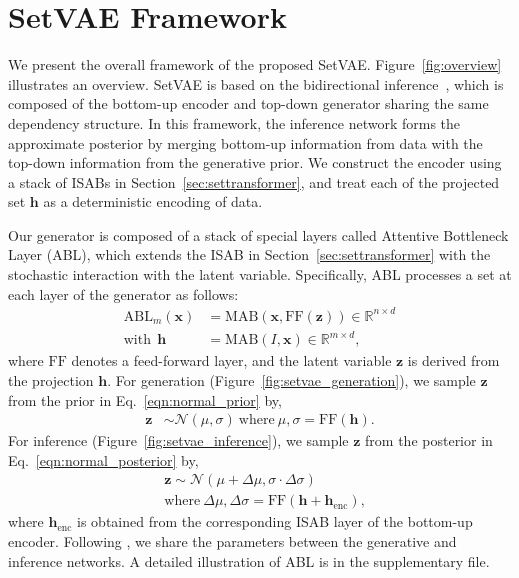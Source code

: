 \documentclass[final]{arxiv/cvpr}
\begin{document}
\section{SetVAE Framework}
\label{sec:architecture}
We present the overall framework of the proposed SetVAE. 
Figure~\ref{fig:overview} illustrates an overview.
SetVAE is based on the bidirectional inference~\cite{sonderby2016ladder}, which is composed of the bottom-up encoder and top-down generator sharing the same dependency structure.
In this framework, the inference network forms the approximate posterior by merging bottom-up information from data with the top-down information from the generative prior.
We construct the encoder using a stack of ISABs in Section~\ref{sec:settransformer}, and treat each of the projected set $\mathbf{h}$ as a deterministic encoding of data.

Our generator is composed of a stack of special layers called Attentive Bottleneck Layer (ABL), which extends the ISAB in Section~\ref{sec:settransformer} with the stochastic interaction with the latent variable.
Specifically, ABL processes a set at each layer of the generator as follows:
\begin{align}
    \text{ABL}_m(\mathbf{x}) &= \text{MAB}(\mathbf{x}, \text{FF}(\mathbf{z}))\in \mathbb{R}^{n\times d}\label{eqn:abp}\\
    \text{with}~~\mathbf{h} &= \text{MAB}(I, \mathbf{x})\in \mathbb{R}^{m\times d}\label{eqn:abl_bottleneck},
\end{align}
where $\text{FF}$ denotes a feed-forward layer, and the latent variable $\mathbf{z}$ is derived from the projection $\mathbf{h}$.
For generation (Figure~\ref{fig:setvae_generation}), we sample $\mathbf{z}$ from the prior in Eq.~\eqref{eqn:normal_prior} by,
\begin{align}
    \mathbf{z} &\sim \mathcal{N}(\mu, \sigma)~\text{where}~\mu, \sigma = \text{FF}(\mathbf{h}).
    \label{eqn:abp_z_prior}
\end{align}
For inference (Figure~\ref{fig:setvae_inference}), we sample $\mathbf{z}$ from the posterior in Eq.~\eqref{eqn:normal_posterior} by,
\begin{align}
&\mathbf{z} \sim \mathcal{N}(\mu+\Delta\mu, \sigma\cdot\Delta\sigma) \nonumber\\
&\text{where}~\Delta\mu, \Delta\sigma = \text{FF}(\mathbf{h}+\mathbf{h}_{\text{enc}}),
    \label{eqn:abp_z_posterior}
\end{align}
where $\mathbf{h}_{\text{enc}}$ is obtained from the corresponding ISAB layer of the bottom-up encoder.
Following \cite{sonderby2016ladder}, we share the parameters between the generative and inference networks.
A detailed illustration of ABL is in the supplementary file.
\end{document}
